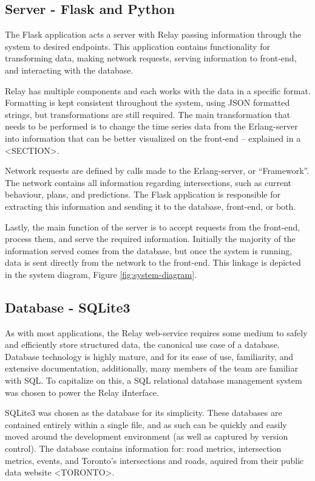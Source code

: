 \documentclass{report}
\begin{document}
\subsection{Server - Flask and Python}
The Flask application acts a server with Relay passing information through the system to desired endpoints. This application contains functionality for transforming data, making network requests, serving information to front-end, and interacting with the database.

	Relay has multiple components and each works with the data in a specific format. Formatting is kept consistent throughout the system, using JSON formatted strings, but transformations are still required. The main transformation that needs to be performed is to change the time series data from the Erlang-server into information that can be better visualized on the front-end – explained in a <SECTION>.

	Network requests are defined by calls made to the Erlang-server, or “Framework”. The network contains all information regarding intersections, such as current behaviour, plans, and predictions. The Flask application is responsible for extracting this information and sending it to the database, front-end, or both.

	Lastly, the main function of the server is to accept requests from the front-end, process them, and serve the required information. Initially the majority of the information served comes from the database, but once the system is running, data is sent directly from the network to the front-end. This linkage is depicted in the system diagram, Figure \ref{fig:system-diagram}.

\subsection{Database - SQLite3}

As with most applications, the Relay web-service requires some medium to safely and efficiently store structured data, the canonical use case of a database.
Database technology is highly mature, and for its ease of use, familiarity, and extensive documentation, additionally, many members of the team are familiar with SQL.
To capitalize on this, a SQL relational database management system was chosen to power the Relay iInterface.

SQLite3 was chosen as the database for its simplicity. 
These databases are contained entirely within a single file, and as such can be quickly and easily moved around the development environment (as well as captured by version control). 
The database contains information for: road metrics, intersection metrics, events, and Toronto's intersections and roads, aquired from their public data website <TORONTO>.
\end{document}

